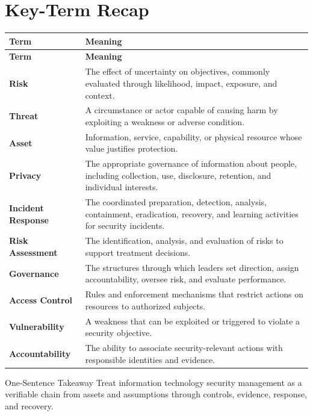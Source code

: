 \documentclass[11pt,letterpaper]{article}
\begin{document}
\section*{Key-Term Recap}
\begin{longtable}{>{\raggedright\arraybackslash}p{}>{\raggedright\arraybackslash}p{}}
\toprule\rowcolor{Navy}\color{white}\textbf{Term} & \color{white}\textbf{Meaning}\\\midrule
\endfirsthead
\toprule\rowcolor{Navy}\color{white}\textbf{Term} & \color{white}\textbf{Meaning}\\\midrule
\endhead
\textbf{Risk} & The effect of uncertainty on objectives, commonly evaluated through likelihood, impact, exposure, and context. \\\midrule
\textbf{Threat} & A circumstance or actor capable of causing harm by exploiting a weakness or adverse condition. \\\midrule
\textbf{Asset} & Information, service, capability, or physical resource whose value justifies protection. \\\midrule
\textbf{Privacy} & The appropriate governance of information about people, including collection, use, disclosure, retention, and individual interests. \\\midrule
\textbf{Incident Response} & The coordinated preparation, detection, analysis, containment, eradication, recovery, and learning activities for security incidents. \\\midrule
\textbf{Risk Assessment} & The identification, analysis, and evaluation of risks to support treatment decisions. \\\midrule
\textbf{Governance} & The structures through which leaders set direction, assign accountability, oversee risk, and evaluate performance. \\\midrule
\textbf{Access Control} & Rules and enforcement mechanisms that restrict actions on resources to authorized subjects. \\\midrule
\textbf{Vulnerability} & A weakness that can be exploited or triggered to violate a security objective. \\\midrule
\textbf{Accountability} & The ability to associate security-relevant actions with responsible identities and evidence. \\\midrule
\bottomrule
\end{longtable}
\begin{CornellExamBox}{One-Sentence Takeaway}
Treat information technology security management as a verifiable chain from assets and assumptions through controls, evidence, response, and recovery.
\end{CornellExamBox}
\end{document}
